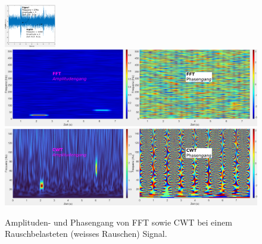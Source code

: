 \begin{figure}
	\centering
	\includegraphics[width=0.2\textwidth]{papers/wavelets/images/18-4_CWTvsFFTSignalNoisy.png}
	\includegraphics[width=\textwidth]{papers/wavelets/images/18-5_FFTnoisy.png}
	\includegraphics[width=\textwidth]{papers/wavelets/images/18-6_CWTnoisy.png}
	\caption{Amplituden- und Phasengang von FFT sowie CWT bei einem Rauschbelasteten (weisses Rauschen) Signal.}
	\label{wavelet:fig:FFTnoisy}
\end{figure}
